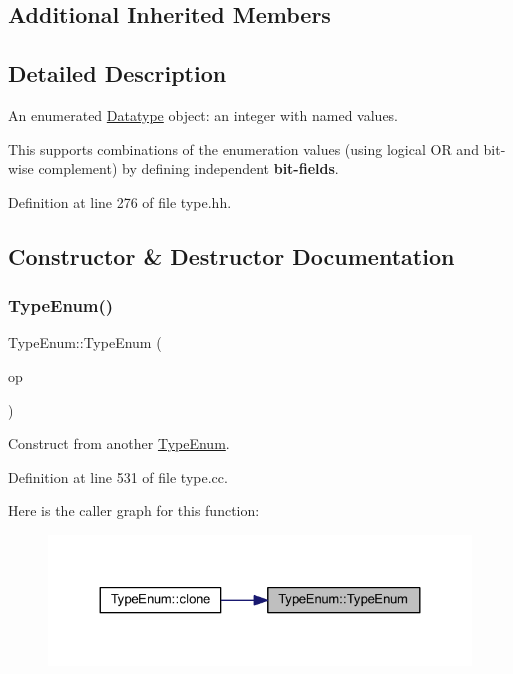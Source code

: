 \subsection*{Additional Inherited Members}


\subsection{Detailed Description}
An enumerated \mbox{\hyperlink{class_datatype}{Datatype}} object\+: an integer with named values. 

This supports combinations of the enumeration values (using logical OR and bit-\/wise complement) by defining independent {\bfseries{bit-\/fields}}. 

Definition at line 276 of file type.\+hh.



\subsection{Constructor \& Destructor Documentation}
\mbox{\label{class_type_enum_a95accac1e8a92b0ae55ea96c89e9e8a0}} 
\subsubsection{\texorpdfstring{TypeEnum()}{TypeEnum()}\hspace{0.1cm}{\footnotesize\ttfamily [1/3]}}
{\footnotesize\ttfamily Type\+Enum\+::\+Type\+Enum (\begin{DoxyParamCaption}\item[{const \mbox{\hyperlink{class_type_enum}{Type\+Enum}} \&}]{op }\end{DoxyParamCaption})}



Construct from another \mbox{\hyperlink{class_type_enum}{Type\+Enum}}. 



Definition at line 531 of file type.\+cc.

Here is the caller graph for this function\+:
\nopagebreak
\begin{figure}[H]
\begin{center}
\leavevmode
\includegraphics[width=324pt]{class_type_enum_a95accac1e8a92b0ae55ea96c89e9e8a0_icgraph}
\end{center}
\end{figure}
\mbox{\label{class_type_enum_aacd079a04693c1610315e299ad7ce2c6}} 
